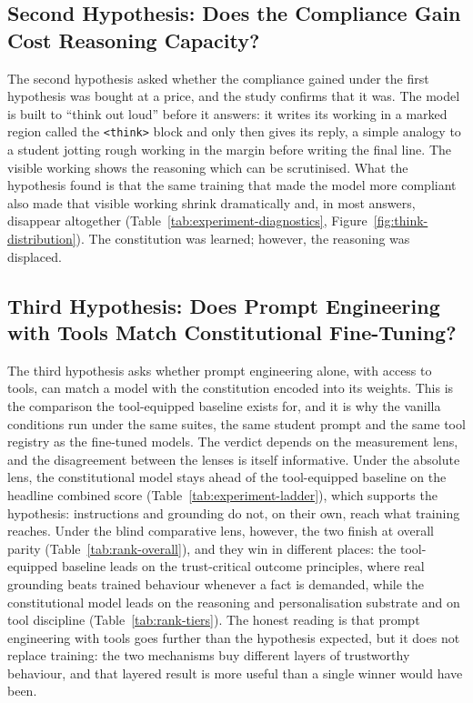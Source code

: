 \subsection{Second Hypothesis: Does the Compliance Gain Cost Reasoning Capacity?}
\label{subsec:h2-capacity-cost}

The second hypothesis asked whether the compliance gained under the first hypothesis was bought at a price, and the study confirms that it was. The model is built to ``think out loud'' before it answers: it writes its working in a marked region called the \texttt{<think>} block and only then gives its reply, a simple analogy to a student jotting rough working in the margin before writing the final line. The visible working shows the reasoning which can be scrutinised. What the hypothesis found is that the same training that made the model more compliant also made that visible working shrink dramatically and, in most answers, disappear altogether (Table~\ref{tab:experiment-diagnostics}, Figure~\ref{fig:think-distribution}). The constitution was learned; however, the reasoning was displaced.


\subsection{Third Hypothesis: Does Prompt Engineering with Tools Match Constitutional Fine-Tuning?}
\label{subsec:h3-prompt-engineering}

The third hypothesis asks whether prompt engineering alone, with access to tools, can match a model with the constitution encoded into its weights. This is the comparison the tool-equipped baseline exists for, and it is why the vanilla conditions run under the same suites, the same student prompt and the same tool registry as the fine-tuned models. The verdict depends on the measurement lens, and the disagreement between the lenses is itself informative. Under the absolute lens, the constitutional model stays ahead of the tool-equipped baseline on the headline combined score (Table~\ref{tab:experiment-ladder}), which supports the hypothesis: instructions and grounding do not, on their own, reach what training reaches. Under the blind comparative lens, however, the two finish at overall parity (Table~\ref{tab:rank-overall}), and they win in different places: the tool-equipped baseline leads on the trust-critical outcome principles, where real grounding beats trained behaviour whenever a fact is demanded, while the constitutional model leads on the reasoning and personalisation substrate and on tool discipline (Table~\ref{tab:rank-tiers}). The honest reading is that prompt engineering with tools goes further than the hypothesis expected, but it does not replace training: the two mechanisms buy different layers of trustworthy behaviour, and that layered result is more useful than a single winner would have been.


